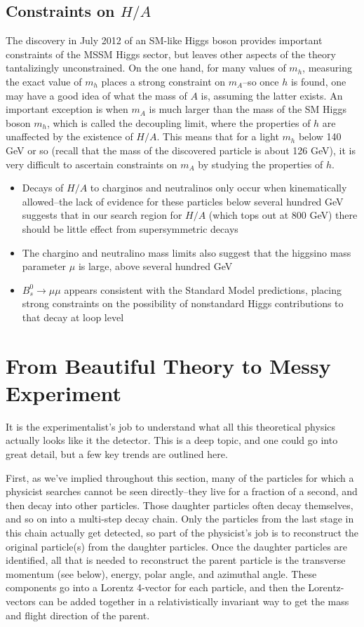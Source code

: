 \subsection{Constraints on $H/A$}
The discovery in July 2012 of an SM-like Higgs boson provides important constraints of the MSSM Higgs sector,
 but leaves other aspects of the theory tantalizingly unconstrained.  On the one hand, 
for many values of $m_h$, measuring the exact value of $m_h$ 
places a strong constraint on $m_A$--so once $h$ is found, one may have a good idea of what the mass of 
$A$ is, assuming the latter exists.  An important exception is when 
$m_A$ is much larger than the mass of the SM Higgs 
boson $m_h$, which is called the decoupling limit, where the 
properties of $h$ are unaffected by the existence of $H/A$.
  This means that for a light $m_h$ below 140 GeV 
or so (recall that the mass of the discovered particle is about 126 GeV),
 it is very difficult to ascertain constraints on $m_A$ by studying the properties of $h$.  

\begin{itemize}
    \item Decays of $H/A$ to charginos and neutralinos only occur when kinematically 
allowed--the lack of evidence for these particles below several hundred GeV suggests
that in our search region for $H/A$ (which tops out at 800 GeV) there should be little
effect from supersymmetric decays
    \item The chargino and neutralino mass limits also suggest that the higgsino mass
parameter $\mu$ is large, above several hundred GeV
    \item $B_s^0\rightarrow\mu\mu$ appears consistent with the Standard Model predictions,
placing strong constraints on the possibility of nonstandard Higgs contributions
to that decay at loop level \cite{bs_to_mumu}
\end{itemize}

\section{From Beautiful Theory to Messy Experiment}

It is the experimentalist's job to understand what all this theoretical physics actually looks like it the detector.  This is a deep topic, and one could go into great detail, but a few key trends are outlined here.

First, as we've implied throughout this section, many of the particles for which a physicist searches cannot be seen directly--they live for a fraction of a second, and then decay into other particles.  Those daughter particles often decay themselves, and so on into a  multi-step decay chain.  Only the particles from the last stage in this chain actually get detected, so part of the physicist's job is to reconstruct the original particle(s) from the daughter particles.  Once the daughter particles are identified, all that is needed to reconstruct the parent particle is the transverse momentum (see below), energy, polar angle, and azimuthal angle.  These components go into a Lorentz 4-vector for each particle, and then the Lorentz-vectors can be added together in a relativistically invariant way to get the mass and flight direction of the parent.

